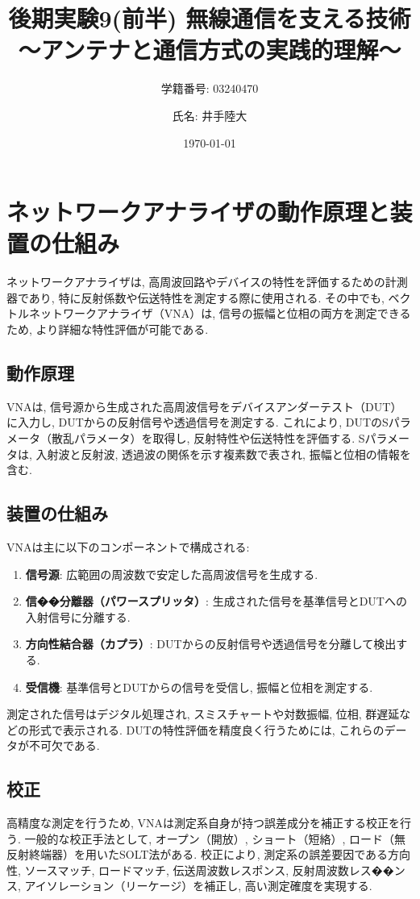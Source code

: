 \documentclass[a4paper, twocolumn]{article} %
\title{後期実験9(前半) 無線通信を支える技術
～アンテナと通信方式の実践的理解～}
\author{学籍番号: 03240470 \and 氏名: 井手陸大}
\date{\today}
\begin{document}
\maketitle

\section{ネットワークアナライザの動作原理と装置の仕組み}
ネットワークアナライザは, 高周波回路やデバイスの特性を評価するための計測器であり, 特に反射係数や伝送特性を測定する際に使用される. その中でも, ベクトルネットワークアナライザ（VNA）は, 信号の振幅と位相の両方を測定できるため, より詳細な特性評価が可能である.

\subsection{動作原理}
VNAは, 信号源から生成された高周波信号をデバイスアンダーテスト（DUT）に入力し, DUTからの反射信号や透過信号を測定する. これにより, DUTのSパラメータ（散乱パラメータ）を取得し, 反射特性や伝送特性を評価する. Sパラメータは, 入射波と反射波, 透過波の関係を示す複素数で表され, 振幅と位相の情報を含む.

\subsection{装置の仕組み}
VNAは主に以下のコンポーネントで構成される:
\begin{enumerate}
    \item \textbf{信号源}: 広範囲の周波数で安定した高周波信号を生成する.
    \item \textbf{信��分離器（パワースプリッタ）}: 生成された信号を基準信号とDUTへの入射信号に分離する.
    \item \textbf{方向性結合器（カプラ）}: DUTからの反射信号や透過信号を分離して検出する.
    \item \textbf{受信機}: 基準信号とDUTからの信号を受信し, 振幅と位相を測定する.
\end{enumerate}

測定された信号はデジタル処理され, スミスチャートや対数振幅, 位相, 群遅延などの形式で表示される. DUTの特性評価を精度良く行うためには, これらのデータが不可欠である.

\subsection{校正}
高精度な測定を行うため, VNAは測定系自身が持つ誤差成分を補正する校正を行う. 一般的な校正手法として, オープン（開放）, ショート（短絡）, ロード（無反射終端器）を用いたSOLT法がある. 校正により, 測定系の誤差要因である方向性, ソースマッチ, ロードマッチ, 伝送周波数レスポンス, 反射周波数レス��ンス, アイソレーション（リーケージ）を補正し, 高い測定確度を実現する.
\end{document}
